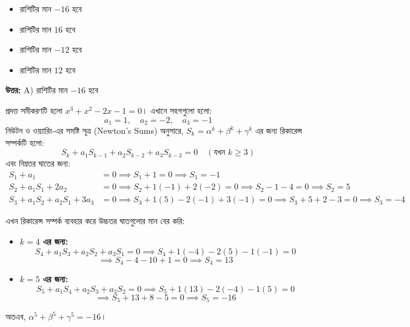\documentclass[12pt, a4paper]{article}
\begin{document}
\begin{itemize}[label={}, leftmargin=1cm, itemsep=0.5em]
    \item[\textbf{A)}] রাশিটির মান $-16$ হবে
    \item[\textbf{B)}] রাশিটির মান $16$ হবে
    \item[\textbf{C)}] রাশিটির মান $-12$ হবে
    \item[\textbf{D)}] রাশিটির মান $12$ হবে
\end{itemize}

\vspace{0.5em}
\begin{tcolorbox}[answerbox]
    \textbf{\color{success} উত্তর:} A) রাশিটির মান $-16$ হবে
\end{tcolorbox}
\vspace{1em}

\begin{tcolorbox}[solutionbox={সমাধান (Solution)}]
    \noindent
    প্রদত্ত সমীকরণটি হলো $x^3 + x^2 - 2x - 1 = 0$। এখানে সহগগুলো হলো:
    \[ a_1 = 1, \quad a_2 = -2, \quad a_3 = -1 \]
    নিউটন ও ওয়্যারিং-এর সমষ্টি সূত্র (Newton's Sums) অনুসারে, $S_k = \alpha^k + \beta^k + \gamma^k$ এর জন্য রিকারেন্স সম্পর্কটি হলো:
    \[ S_k + a_1 S_{k-1} + a_2 S_{k-2} + a_3 S_{k-3} = 0 \quad (\text{যখন } k \ge 3) \]
    এবং নিম্নতর ঘাতের জন্য:
    \begin{align*}
        S_1 + a_1 &= 0 \implies S_1 + 1 = 0 \implies S_1 = -1 \\
        S_2 + a_1 S_1 + 2a_2 &= 0 \implies S_2 + 1(-1) + 2(-2) = 0 \implies S_2 - 1 - 4 = 0 \implies S_2 = 5 \\
        S_3 + a_1 S_2 + a_2 S_1 + 3a_3 &= 0 \implies S_3 + 1(5) - 2(-1) + 3(-1) = 0 \implies S_3 + 5 + 2 - 3 = 0 \implies S_3 = -4
    \end{align*}
    
    \vspace{0.5em}
    এখন রিকারেন্স সম্পর্ক ব্যবহার করে উচ্চতর ঘাতগুলোর মান বের করি:
    \begin{itemize}[itemsep=0.4em]
        \item \textbf{$k=4$ এর জন্য:} 
        \[ S_4 + a_1 S_3 + a_2 S_2 + a_3 S_1 = 0 \implies S_4 + 1(-4) - 2(5) - 1(-1) = 0 \]
        \[ \implies S_4 - 4 - 10 + 1 = 0 \implies S_4 = 13 \]
        
        \item \textbf{$k=5$ এর জন্য:} 
        \[ S_5 + a_1 S_4 + a_2 S_3 + a_3 S_2 = 0 \implies S_5 + 1(13) - 2(-4) - 1(5) = 0 \]
        \[ \implies S_5 + 13 + 8 - 5 = 0 \implies S_5 = -16 \]
    \end{itemize}
    অতএব, $\alpha^5 + \beta^5 + \gamma^5 = -16$।
\end{tcolorbox}
\end{document}
